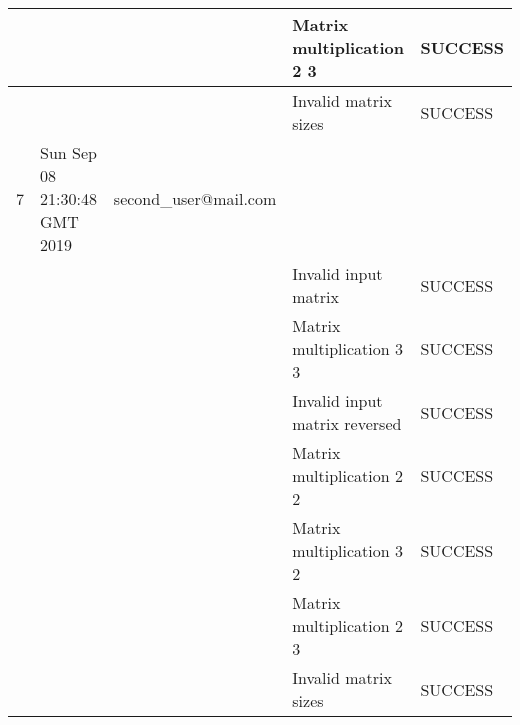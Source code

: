 \begin{center}
\begin{longtable}{|l|l|l|l|l|}
    &                              &                                 & Matrix multiplication 2 3     & SUCCESS \\ \hline
    &                              &                                 & Invalid matrix sizes          & SUCCESS \\ \hline
    7     & Sun Sep 08 21:30:48 GMT 2019 & second\_user@mail.com               &                               &         \\ \hline
    &                              &                                 & Invalid input matrix          & SUCCESS \\ \hline
    &                              &                                 & Matrix multiplication 3 3     & SUCCESS \\ \hline
    &                              &                                 & Invalid input matrix reversed & SUCCESS \\ \hline
    &                              &                                 & Matrix multiplication 2 2     & SUCCESS \\ \hline
    &                              &                                 & Matrix multiplication 3 2     & SUCCESS \\ \hline
    &                              &                                 & Matrix multiplication 2 3     & SUCCESS \\ \hline
    &                              &                                 & Invalid matrix sizes          & SUCCESS \\ \hline
\end{longtable}

\end{center}

\normalsize